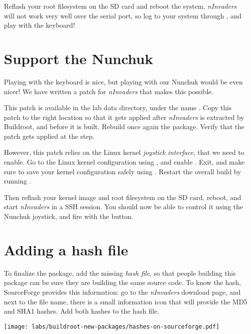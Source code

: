Reflash your root filesystem on the SD card and reboot the
system. {\em nInvaders} will not work very well over the serial port,
so log to your system through , and play 
with the keyboard!

\section{Support the Nunchuk}

Playing with the keyboard is nice, but playing with our Nunchuk would
be even nicer! We have written a patch for {\em nInvaders} that makes
this possible.

This patch is available in the lab data directory, under the name
. Copy this patch to the right
location so that it gets applied after {\em nInvaders} is extracted by
Buildroot, and before it is built. Rebuild once again the
 package. Verify that the patch gets applied at the
 step.

However, this patch relies on the Linux kernel {\em joystick
  interface}, that we need to enable. Go to the Linux kernel
configuration using , and enable
. Exit, and make sure to save your kernel
configuration safely using . Restart
the overall build by running .

Then reflash your kernel image and root filesystem on the SD card,
reboot, and start {\em nInvaders} in a SSH session. You should now be
able to control it using the Nunchuk joystick, and fire with the
 button.

\section{Adding a hash file}

To finalize the package, add the missing {\em hash file}, so that
people building this package can be sure they are building the same
source code. To know the hash, SourceForge provides this information:
go to the {\em nInvaders} download page, and next to the file name,
there is a small information icon that will provide the MD5 and SHA1
hashes. Add both hashes to the hash file.

\begin{center}
\texttt{[image: labs/buildroot-new-packages/hashes-on-sourceforge.pdf]}
\end{center}

